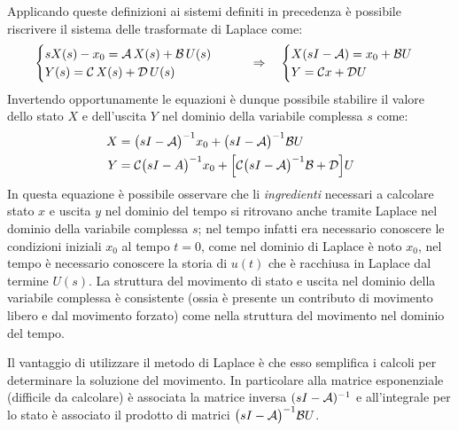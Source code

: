 	Applicando queste definizioni ai sistemi definiti in precedenza è possibile riscrivere il sistema delle trasformate di Laplace come:
	\[\begin{cases}
		s X(s) -x_0 = \mathcal A \, X(s) + \mathcal B \,  U (s)  \\
		Y(s) = \mathcal C \, X(s) + \mathcal D \, U(s)
	\end{cases} \qquad \Rightarrow \quad \begin{cases}
		X (sI - \mathcal A ) = x_0 + \mathcal B U \\ Y = \mathcal C x + \mathcal D U
	\end{cases}\]
	Invertendo opportunamente le equazioni è dunque possibile stabilire il valore dello stato $X$ e dell'uscita $Y$ nel dominio della variabile complessa $s$ come:
	\begin{equation} \label{eq:vcomp:statouscita}
		\begin{split}
			X& = \big(sI - \mathcal A\big)^{-1} x_0 + \big(sI-\mathcal A\big)^{-1}\mathcal B U \\  Y & = \mathcal C \big(sI-A\big)^{-1} x_0 + \Big[\mathcal C \big(sI-\mathcal A\big)^{-1} \mathcal B + \mathcal D\Big] U 
		\end{split}
	\end{equation}		
	In questa equazione è possibile osservare che li \textit{ingredienti} necessari a calcolare stato $x$ e uscita $y$ nel dominio del tempo si ritrovano anche tramite Laplace nel dominio della variabile complessa $s$; nel tempo infatti era necessario conoscere le condizioni iniziali $x_0$ al tempo  $t=0$, come nel dominio di Laplace è noto $x_0$, nel tempo è necessario conoscere  la storia di $u(t)$ che è racchiusa in Laplace dal termine $U(s)$. La struttura del movimento di stato e uscita nel dominio della variabile complessa è consistente (ossia è presente un contributo di movimento libero e dal movimento forzato) come nella struttura del movimento nel dominio del tempo.	
	
	Il vantaggio di utilizzare il metodo di Laplace è che esso semplifica i calcoli per determinare la soluzione del movimento. In particolare alla matrice esponenziale (difficile da calcolare) è associata la matrice inversa $(sI-\mathcal A)^{-1}$ e all'integrale per lo stato è associato il prodotto di matrici	 $\big(sI-\mathcal A\big)^{-1}\mathcal B U$.
	
	
